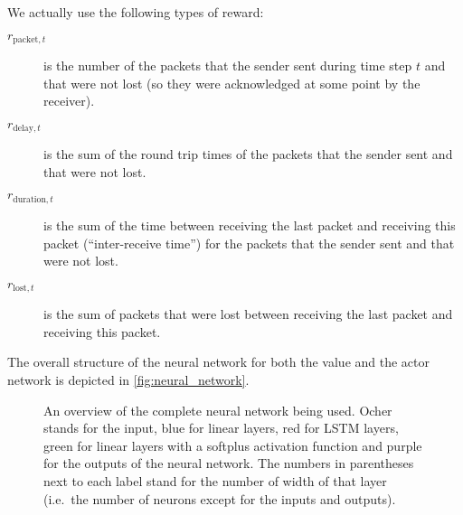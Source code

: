 \documentclass[sigconf]{acmart}
\begin{document}
We actually use the following types of reward: 
\begin{description}
\item[$\textit{r}_{\text{packet},t}$] is the number of the packets that the sender sent during time step $t$ and that were not lost (so they were acknowledged at some point by the receiver).
\item[$\textit{r}_{\text{delay},t}$] is the sum of the round trip times of the packets that the sender sent and that were not lost.
\item[$\textit{r}_{\text{duration},t}$] is the sum of the time between receiving the last packet and receiving this packet (``inter-receive time'') for the packets that the sender sent and that were not lost.
\item[$\textit{r}_{\text{lost},t}$] is the sum of packets that were lost between receiving the last packet and receiving this packet.
\end{description}


The overall structure of the neural network for both the value and the actor network is depicted in \autoref{fig:neural_network}.

\begin{figure}



\caption{An overview of the complete neural network being used. Ocher stands for the input, blue for linear layers, red for LSTM layers, green for linear layers with a softplus activation function and purple for the outputs of the neural network. The numbers in parentheses next to each label stand for the number of width of that layer (i.e.~the number of neurons except for the inputs and outputs).}
\label{fig:neural_network}
\end{figure}
\end{document}
